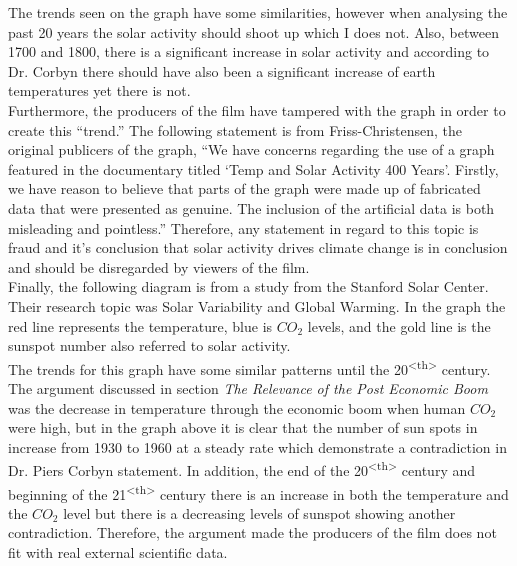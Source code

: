 \documentclass[12pt]{article}
\begin{document}

The trends seen on the graph have some similarities, however when analysing the past 20 years the solar activity should shoot up which I does not. Also, between 1700 and 1800, there is a significant increase in solar activity and according to Dr. Corbyn there should have also been a significant increase of earth temperatures yet there is not. \\

Furthermore, the producers of the film have tampered with the graph in order to create this “trend.” The following statement is from Friss-Christensen, the original publicers of the graph, “We have concerns regarding the use of a graph featured in the documentary titled ‘Temp and Solar Activity 400 Years’. Firstly, we have reason to believe that parts of the graph were made up of fabricated data that were presented as genuine. The inclusion of the artificial data is both misleading and pointless.” Therefore, any statement in regard to this topic is fraud and it’s conclusion that solar activity drives climate change is in conclusion and should be disregarded by viewers of the film. \\

Finally, the following diagram is from a study from the Stanford Solar Center. Their research topic was Solar Variability and Global Warming. In the graph the red line represents the temperature, blue is $CO_2$ levels, and the gold line is the sunspot number also referred to solar activity. \\


The trends for this graph have some similar patterns until the 20\textsuperscript {<th>} century. The argument discussed in section \textit{The Relevance of the Post Economic Boom} was the decrease in temperature through the economic boom when human $CO_2$ were high, but in the graph above it is clear that the number of sun spots in increase from 1930 to 1960 at a steady rate which demonstrate a contradiction in Dr. Piers Corbyn statement. In addition, the end of the 20\textsuperscript {<th>} century and beginning of the 21\textsuperscript {<th>} century there is an increase in both the temperature and the $CO_2$ level but there is a decreasing levels of sunspot showing another contradiction. Therefore, the argument made the producers of the film does not fit with real external scientific data.  \\
\end{document}
